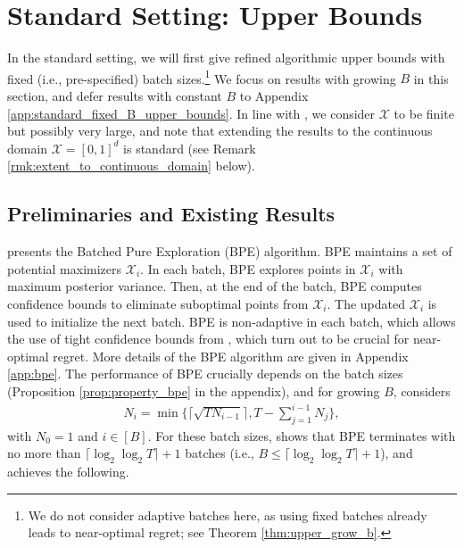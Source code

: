 \documentclass[10pt]{article}
\begin{document}
\section{Standard Setting: Upper Bounds}
\label{sec:standard_upper_bound}

In the standard setting, we will first give refined algorithmic upper bounds with fixed (i.e., pre-specified) batch sizes.\footnote{We do not consider adaptive batches here, as using fixed batches already leads to near-optimal regret; see Theorem \ref{thm:upper_grow_b}.}
We focus on results with growing $B$ in this section, and defer results with constant $B$ to Appendix \ref{app:standard_fixed_B_upper_bounds}.
In line with \citep{Li22}, we consider $\mathcal{X}$ to be finite but possibly very large, and note that extending the results to the continuous domain $\mathcal{X}=[0,1]^d$ is standard (see Remark \ref{rmk:extent_to_continuous_domain} below).

\subsection{Preliminaries and Existing Results}
\label{sec:standard_upper_bound_li}
\citep{Li22} presents the Batched Pure Exploration (BPE) algorithm. 
BPE maintains a set of potential maximizers $\mathcal{X}_i$. In each batch, BPE explores points in $\mathcal{X}_i$ with maximum posterior variance. Then, at the end of the batch, BPE computes confidence bounds to eliminate suboptimal points from $\mathcal{X}_i$. The updated $\mathcal{X}_i$ is used to initialize the next batch.
BPE is non-adaptive in each batch, which allows the use of tight confidence bounds from \citep{Vakili21a}, which turn out to be crucial for near-optimal regret.
More details of the BPE algorithm are given in Appendix \ref{app:bpe}.
The performance of BPE crucially depends on the batch sizes (Proposition \ref{prop:property_bpe} in the appendix), and for growing $B$, \citep{Li22} considers 
\begin{align}
    N_i=\min \biggl\{ \big\lceil \sqrt{TN_{i-1}} \big\rceil, T-\sum_{j=1}^{i-1}N_j\biggr\}, \label{eq:grow_b_batch_sizes_li}
\end{align}
with $N_0=1$ and $i\in [B]$. 
For these batch sizes, \citep{Li22} shows that BPE terminates with no more than $\lceil \log_2\log_2 T \rceil + 1$ batches (i.e., $B \leq \lceil \log_2\log_2 T \rceil + 1$), 
and achieves the following.
\end{document}

